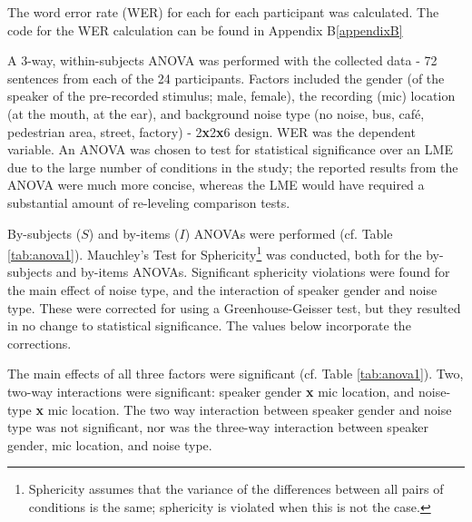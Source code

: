 \DIFdelend The word error rate (WER) for each \DIFdelbegin {}\DIFdelend \DIFaddbegin {}\DIFaddend for each participant was calculated. The code for the WER calculation can be found in Appendix B\ref{appendixB}

A 3-way, within-subjects ANOVA was performed with the collected data - 72 sentences from each of the 24 participants. Factors included the gender (of the speaker of the pre-recorded stimulus; male, female), the recording (mic) location (at the mouth, at the ear), and background noise type (no noise, bus, caf\'{e}, pedestrian area, street, factory) - 2\textbf{x}2\textbf{x}6 design.  WER was the dependent variable.  An ANOVA was chosen to test for statistical significance over an LME due to the large number of conditions in the study; the reported results from the ANOVA were much more concise, whereas the LME would have required a substantial amount of re-leveling comparison tests.  

By-subjects ($S$) and by-items ($I$) ANOVAs were performed (cf. Table \ref{tab:anova1}). Mauchley's Test for Sphericity\footnote{Sphericity assumes that the variance of the differences between all pairs of conditions is the same; sphericity is violated when this is not the case.} was conducted, both for the by-subjects and by-items ANOVAs.  Significant sphericity violations were found for the main effect of noise type, and the interaction of speaker gender and noise type.  These were corrected for using a Greenhouse-Geisser test, but they resulted in no change to statistical significance.  The values below incorporate the corrections.


The main effects of all three factors were significant (cf. Table \ref{tab:anova1}).  Two, two-way interactions were significant: speaker gender \textbf{x} mic location, and noise-type \textbf{x} mic location. The two way interaction between speaker gender and noise type was not significant, nor was the three-way interaction between speaker gender, mic location, and noise type.


